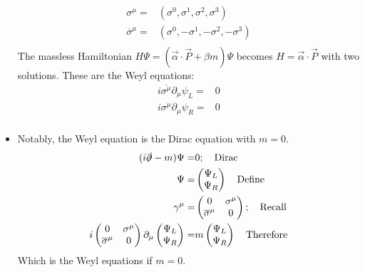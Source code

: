 \begin{itemize}
        \begin{equation}\begin{split}
        \sigma^\mu=&(\sigma^0,\sigma^1,\sigma^2,\sigma^3) \\
        \overline{\sigma}^\mu=&(\sigma^0,-\sigma^1,-\sigma^2,-\sigma^3) \\
        \end{split}\end{equation}
        The massless Hamiltonian $H\Psi=(\vec{\alpha}\cdot\vec{P}+\beta m)\Psi$ becomes $H=\vec{\alpha}\cdot\vec{P}$ with two solutions. These are the Weyl equations:
        \begin{equation}\begin{split}
            i\overline{\sigma^\mu}\partial_\mu\psi_L=&0 \\
            i\sigma^\mu\partial_\mu\psi_R=&0 \\
        \end{split}\end{equation}
    \item Notably, the Weyl equation is the Dirac equation with $m=0$. \cite{wells}
        \begin{equation}\begin{split}
            (i\slashed{\partial}-m)\Psi=&0; \quad \text{Dirac} \\
            \Psi=&\begin{pmatrix}\Psi_L\\\Psi_R\end{pmatrix} \quad \text{Define} \\
            \gamma^\mu =& \begin{pmatrix}0&\sigma^\mu\\\overline{\sigma}^\mu&0\end{pmatrix} ;\quad\text{Recall} \\
            i\begin{pmatrix}0&\sigma^\mu\\\overline{\sigma}^\mu&0\end{pmatrix}\partial_\mu\begin{pmatrix}\Psi_L\\\Psi_R\end{pmatrix}=&m\begin{pmatrix}\Psi_L\\\Psi_R\end{pmatrix} \quad \text{Therefore}
        \end{split}\end{equation}
        Which is the Weyl equations if $m=0$.

\end{itemize}
